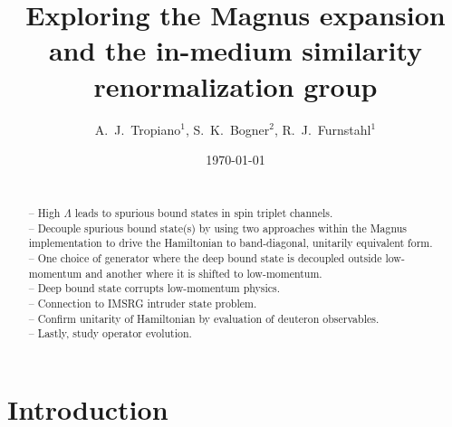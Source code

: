 \documentclass[preprintnumbers,floatfix,aps,prc,preprint,nofootinbib]{revtex4-1}
\begin{document}
\title{Exploring the Magnus expansion and the in-medium similarity renormalization group}


\author{A.~J.~Tropiano$^{1}$, S.~K.~Bogner$^{2}$, R.~J.~Furnstahl$^{1}$}


\date{\today}

\begin{abstract}

\\
-- High $\Lambda$ leads to spurious bound states in spin triplet channels.
\\
-- Decouple spurious bound state(s) by using two approaches within the Magnus implementation to drive the Hamiltonian to band-diagonal, unitarily equivalent form.
\\
-- One choice of generator where the deep bound state is decoupled outside low-momentum and another where it is shifted to low-momentum.
\\
-- Deep bound state corrupts low-momentum physics.
\\
-- Connection to IMSRG intruder state problem.
\\
-- Confirm unitarity of Hamiltonian by evaluation of deuteron observables.
\\
-- Lastly, study operator evolution.

\end{abstract}

\maketitle

\newpage


\section{Introduction}
\label{sec:intro}
\end{document}
